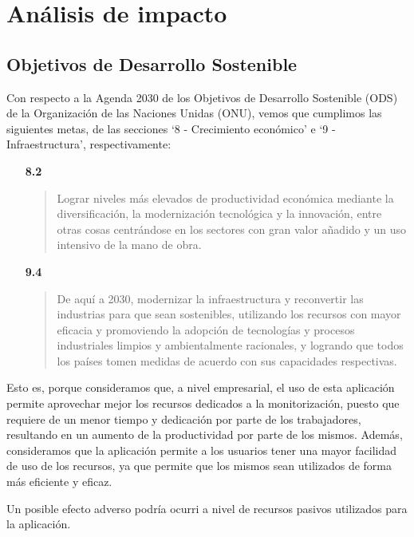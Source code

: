 \chapter{Análisis de impacto}
\label{ch:impacto}
\section{Objetivos de Desarrollo Sostenible}
Con respecto a la Agenda 2030 de los Objetivos de Desarrollo Sostenible\cite{desarrollo_sostenible} (ODS) de la Organización de las Naciones Unidas (ONU), vemos que cumplimos las siguientes metas, de las secciones \enquote*{8 - Crecimiento económico}\cite{crecimiento_economico} e \enquote*{9 - Infraestructura}\cite{infraestructura}, respectivamente:
\begin{itemize}
    \item[\textbf{8.2}] 
        \begin{quote}
            Lograr niveles más elevados de productividad económica mediante la diversificación, la modernización tecnológica y la innovación, entre\\ otras cosas centrándose en los sectores con gran valor añadido y un uso intensivo de la mano de obra.
        \end{quote}
    \item[\textbf{9.4}]
        \begin{quote}
            De aquí a 2030, modernizar la infraestructura y reconvertir las industrias para que sean sostenibles, utilizando los recursos con mayor eficacia y promoviendo la adopción de tecnologías y procesos industriales limpios y ambientalmente racionales, y logrando que todos los países tomen medidas de acuerdo con sus capacidades respectivas.
        \end{quote}
\end{itemize}

Esto es, porque consideramos que, a nivel empresarial, el uso de esta aplicación permite aprovechar mejor los recursos dedicados a la monitorización, puesto que requiere de un menor tiempo y dedicación por parte de los trabajadores, resultando en un aumento de la productividad por parte de los mismos. Además, consideramos que la aplicación permite a los usuarios tener una mayor facilidad de uso de los recursos, ya que permite que los mismos sean utilizados de forma más eficiente y eficaz.

Un posible efecto adverso podría ocurri a nivel de recursos pasivos utilizados para la aplicación.

